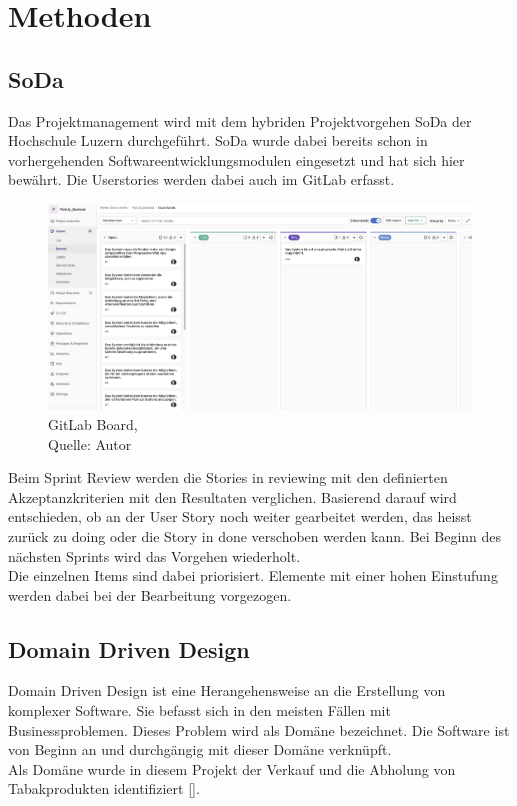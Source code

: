 \section{Methoden}
\subsection{\gls{SoDa}}
Das Projektmanagement wird mit dem hybriden Projektvorgehen \gls{SoDa} der Hochschule Luzern durchgeführt. 
\gls{SoDa} wurde dabei bereits schon in vorhergehenden Softwareentwicklungsmodulen eingesetzt und hat sich hier bewährt. Die Userstories werden dabei auch im \gls{GitLab} erfasst.  
\begin{figure}[H]
	\centering
	\includegraphics[scale=0.5]{images/boardGitlab.png}
	\caption[GitLab Board]{GitLab Board,\\ Quelle: Autor}
	\label{img: GitlLabBoard}
\end{figure}
Beim Sprint Review werden die Stories in reviewing mit den definierten Akzeptanzkriterien mit den Resultaten verglichen. Basierend darauf wird entschieden, ob an der \gls{User Story} noch weiter gearbeitet werden, das heisst zurück zu doing oder die Story in done verschoben werden kann. Bei Beginn des nächsten Sprints wird das Vorgehen wiederholt. \\
Die einzelnen Items sind dabei priorisiert. Elemente mit einer hohen Einstufung werden dabei bei der Bearbeitung vorgezogen. 

\subsection{Domain Driven Design}
Domain Driven Design ist eine Herangehensweise an die Erstellung von komplexer Software. Sie befasst sich in den meisten Fällen mit Businessproblemen. Dieses Problem wird als Domäne bezeichnet. Die Software ist von Beginn an und durchgängig mit dieser Domäne verknüpft. \\
Als Domäne wurde in diesem Projekt der Verkauf und die Abholung von Tabakprodukten identifiziert [\cite{domainDrivenDesign}]. 

